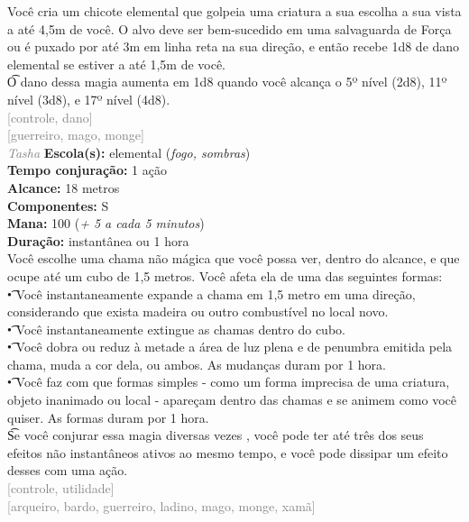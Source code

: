 \documentclass{RPG_Adventure}[2021/10/20]
\begin{document}
{\normalsize Você cria um chicote elemental que golpeia uma criatura a sua escolha a sua vista a até 4,5m de você. O alvo deve ser bem-sucedido em uma salvaguarda de Força ou é puxado por até 3m em linha reta na sua direção, e então recebe 1d8 de dano elemental se estiver a até 1,5m de você.\\\t O dano dessa magia aumenta em 1d8 quando você alcança o 5º nível (2d8), 11º nível (3d8), e 17º nível (4d8).\\}
{\scriptsize \textcolor{gray}{[controle, dano]\\}}
{\scriptsize \textcolor{gray}{[guerreiro, mago, monge]\\}}
{\tiny \textcolor{gray}{\textit{Tasha}}}\jump{}
{\small \t \textbf{Escola(s):} elemental (\textit{fogo, sombras})\\\t \textbf{Tempo conjuração:} 1 ação\\\t \textbf{Alcance:} 18 metros\\\t \textbf{Componentes:} S\\\t \textbf{Mana:} 100 (\textit{+ 5 a cada 5 minutos})\\\t \textbf{Duração:} instantânea ou 1 hora\\}
{\normalsize Você escolhe uma chama não mágica que você possa ver, dentro do alcance, e que ocupe até um cubo de 1,5 metros. Você afeta ela de uma das seguintes formas:\\\t • Você instantaneamente expande a chama em 1,5 metro em uma direção, considerando que exista madeira ou outro combustível no local novo.\\\t • Você instantaneamente extingue as chamas dentro do cubo.\\\t • Você dobra ou reduz à metade a área de luz plena e de penumbra emitida pela chama, muda a cor dela, ou ambos. As mudanças duram por 1 hora.\\\t • Você faz com que formas simples - como um forma imprecisa de uma criatura, objeto inanimado ou local - apareçam dentro das chamas e se animem como você quiser. As formas duram por 1 hora.\\\t Se você conjurar essa magia diversas vezes , você pode ter até três dos seus efeitos não instantâneos ativos ao mesmo tempo, e você pode dissipar um efeito desses com uma ação.\\}
{\scriptsize \textcolor{gray}{[controle, utilidade]\\}}
{\scriptsize \textcolor{gray}{[arqueiro, bardo, guerreiro, ladino, mago, monge, xamã]\\}}
\end{document}

